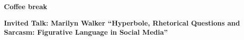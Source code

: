 \vspace{1ex}
\item[15:40--16:00] {\bfseries  Coffee break}

\vspace{1ex}
\item[16:00--17:00] {\bfseries  Invited Talk: Marilyn Walker ``Hyperbole, Rhetorical Questions and Sarcasm: Figurative Language in Social Media''}
